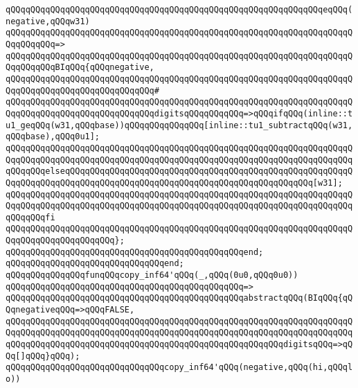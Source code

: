 \newline
\verb|qQQqqQQqqQQqqQQqqQQqqQQqqQQqqQQqqQQqqQQqqQQqqQQqqQQqqQQqqQQqqQQqeqQQq(negative,qQQqw31)|\newline
\verb|qQQqqQQqqQQqqQQqqQQqqQQqqQQqqQQqqQQqqQQqqQQqqQQqqQQqqQQqqQQqqQQqqQQqqQQqqQQqqQQq=>|\newline
\verb|qQQqqQQqqQQqqQQqqQQqqQQqqQQqqQQqqQQqqQQqqQQqqQQqqQQqqQQqqQQqqQQqqQQqqQQqqQQqqQQqBIqQQq{qQQqnegative,|\newline
\verb|qQQqqQQqqQQqqQQqqQQqqQQqqQQqqQQqqQQqqQQqqQQqqQQqqQQqqQQqqQQqqQQqqQQqqQQqqQQqqQQqqQQqqQQqqQQqqQQqqQQq#|\newline
\verb|qQQqqQQqqQQqqQQqqQQqqQQqqQQqqQQqqQQqqQQqqQQqqQQqqQQqqQQqqQQqqQQqqQQqqQQqqQQqqQQqqQQqqQQqqQQqqQQqqQQqdigitsqQQqqQQqqQQq=>qQQqifqQQq(inline::tu1_geqQQq(w31,qQQqbase))qQQqqQQqqQQqqQQq[inline::tu1_subtractqQQq(w31,qQQqbase),qQQq0u1];|\newline
\verb|qQQqqQQqqQQqqQQqqQQqqQQqqQQqqQQqqQQqqQQqqQQqqQQqqQQqqQQqqQQqqQQqqQQqqQQqqQQqqQQqqQQqqQQqqQQqqQQqqQQqqQQqqQQqqQQqqQQqqQQqqQQqqQQqqQQqqQQqqQQqqQQqqQQqelseqQQqqQQqqQQqqQQqqQQqqQQqqQQqqQQqqQQqqQQqqQQqqQQqqQQqqQQqqQQqqQQqqQQqqQQqqQQqqQQqqQQqqQQqqQQqqQQqqQQqqQQqqQQqqQQqqQQqqQQq[w31];|\newline
\verb|qQQqqQQqqQQqqQQqqQQqqQQqqQQqqQQqqQQqqQQqqQQqqQQqqQQqqQQqqQQqqQQqqQQqqQQqqQQqqQQqqQQqqQQqqQQqqQQqqQQqqQQqqQQqqQQqqQQqqQQqqQQqqQQqqQQqqQQqqQQqqQQqqQQqfi|\newline
\verb|qQQqqQQqqQQqqQQqqQQqqQQqqQQqqQQqqQQqqQQqqQQqqQQqqQQqqQQqqQQqqQQqqQQqqQQqqQQqqQQqqQQqqQQqqQQq};|\newline
\verb|qQQqqQQqqQQqqQQqqQQqqQQqqQQqqQQqqQQqqQQqqQQqqQQqend;|\newline
\verb|qQQqqQQqqQQqqQQqqQQqqQQqqQQqqQQqend;|\newline
\newline
\newline
\verb|qQQqqQQqqQQqqQQqfunqQQqcopy_inf64'qQQq(_,qQQq(0u0,qQQq0u0))|\newline
\verb|qQQqqQQqqQQqqQQqqQQqqQQqqQQqqQQqqQQqqQQqqQQqqQQq=>|\newline
\verb|qQQqqQQqqQQqqQQqqQQqqQQqqQQqqQQqqQQqqQQqqQQqqQQqabstractqQQq(BIqQQq{qQQqnegativeqQQq=>qQQqFALSE,|\newline
\verb|qQQqqQQqqQQqqQQqqQQqqQQqqQQqqQQqqQQqqQQqqQQqqQQqqQQqqQQqqQQqqQQqqQQqqQQqqQQqqQQqqQQqqQQqqQQqqQQqqQQqqQQqqQQqqQQqqQQqqQQqqQQqqQQqqQQqqQQqqQQqqQQqqQQqqQQqqQQqqQQqqQQqqQQqqQQqqQQqqQQqqQQqqQQqqQQqqQQqdigitsqQQq=>qQQq[]qQQq}qQQq);|\newline
\verb|qQQqqQQqqQQqqQQqqQQqqQQqqQQqqQQqcopy_inf64'qQQq(negative,qQQq(hi,qQQqlo))|\newline

